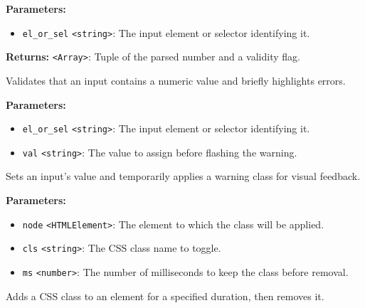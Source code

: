 \documentclass[12pt,a4paper]{article}
\begin{document}
\noindent \textbf{Parameters:}
\begin{itemize}
  \item \texttt{el\_or\_sel} \texttt{<string>}: The input element or selector identifying it.
\end{itemize}

\noindent \textbf{Returns:} \texttt{<Array>}: Tuple of the parsed number and a validity flag.

\noindent Validates that an input contains a numeric value and briefly highlights errors.

\vspace{5mm}
\noindent {}


\noindent \textbf{Parameters:}
\begin{itemize}
  \item \texttt{el\_or\_sel} \texttt{<string>}: The input element or selector identifying it.
  \item \texttt{val} \texttt{<string>}: The value to assign before flashing the warning.
\end{itemize}

\noindent Sets an input’s value and temporarily applies a \textasciigrave{}warning\textasciigrave{} class for visual feedback.

\vspace{5mm}
\noindent {}


\noindent \textbf{Parameters:}
\begin{itemize}
  \item \texttt{node} \texttt{<HTMLElement>}: The element to which the class will be applied.
  \item \texttt{cls} \texttt{<string>}: The CSS class name to toggle.
  \item \texttt{ms} \texttt{<number>}: The number of milliseconds to keep the class before removal.
\end{itemize}

\noindent Adds a CSS class to an element for a specified duration, then removes it.

\vspace{5mm}
\noindent {}
\end{document}
